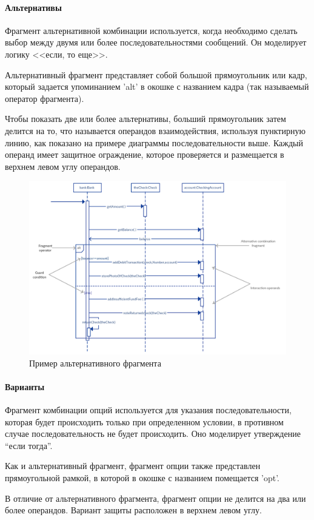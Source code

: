 \documentclass[a4paper,12pt]{extreport}
\begin{document}
\paragraph{Альтернативы}

Фрагмент альтернативной комбинации используется, когда необходимо сделать выбор между двумя или более последовательностями сообщений. Он моделирует логику <<если, то еще>>.

Альтернативный фрагмент представляет собой большой прямоугольник или кадр, который задается упоминанием 'alt' в окошке с названием кадра (так называемый оператор фрагмента).

Чтобы показать две или более альтернативы, больший прямоугольник затем делится на то, что называется операндов взаимодействия, используя пунктирную линию, как показано на примере диаграммы последовательности выше. Каждый операнд имеет защитное ограждение, которое проверяется и размещается в верхнем левом углу операндов.

\begin{figure}[h!]
	\centering
	\includegraphics[width=0.6\linewidth]{images/framealt}
	\caption{Пример альтернативного фрагмента}
	\label{fig:framealt}
\end{figure}


\paragraph{Варианты}

Фрагмент комбинации опций используется для указания последовательности, которая будет происходить только при определенном условии, в противном случае последовательность не будет происходить. Оно моделирует утверждение “если тогда”.

Как и альтернативный фрагмент, фрагмент опции также представлен прямоугольной рамкой, в которой в окошке с названием помещается 'opt'.

В отличие от альтернативного фрагмента, фрагмент опции не делится на два или более операндов. Вариант защиты расположен в верхнем левом углу.
\end{document}
